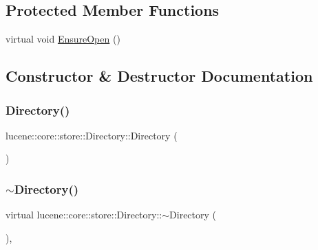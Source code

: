 \subsection*{Protected Member Functions}
\begin{DoxyCompactItemize}
\item 
virtual void \mbox{\hyperlink{classlucene_1_1core_1_1store_1_1Directory_a908bb5ccea0c5fee6d27eedcca686a9f}{Ensure\+Open}} ()
\end{DoxyCompactItemize}


\subsection{Constructor \& Destructor Documentation}
\mbox{\label{classlucene_1_1core_1_1store_1_1Directory_adbf58dbaee741cd16461621cfef867f9}} 
\subsubsection{\texorpdfstring{Directory()}{Directory()}}
{\footnotesize\ttfamily lucene\+::core\+::store\+::\+Directory\+::\+Directory (\begin{DoxyParamCaption}{ }\end{DoxyParamCaption})\hspace{0.3cm}{\ttfamily [default]}}

\mbox{\label{classlucene_1_1core_1_1store_1_1Directory_a564ffbe5f61ca629f4a0ca8b4cd963fd}} 
\subsubsection{\texorpdfstring{$\sim$\+Directory()}{~Directory()}}
{\footnotesize\ttfamily virtual lucene\+::core\+::store\+::\+Directory\+::$\sim$\+Directory (\begin{DoxyParamCaption}{ }\end{DoxyParamCaption})\hspace{0.3cm}{\ttfamily [virtual]}, {\ttfamily [default]}}



